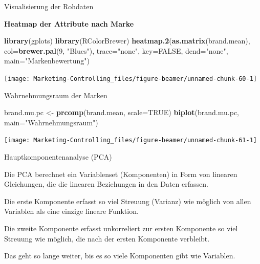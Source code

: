 \documentclass[12pt,ngerman,a4paper,ignorenonframetext,]{beamer}
\newenvironment{Shaded}{\begin{snugshade}}{\end{snugshade}}
\newcommand{\DataTypeTok}[1]{\textcolor[rgb]{0.13,0.29,0.53}{#1}}
\newcommand{\DecValTok}[1]{\textcolor[rgb]{0.00,0.00,0.81}{#1}}
\newcommand{\KeywordTok}[1]{\textcolor[rgb]{0.13,0.29,0.53}{\textbf{#1}}}
\newcommand{\NormalTok}[1]{#1}
\newcommand{\OtherTok}[1]{\textcolor[rgb]{0.56,0.35,0.01}{#1}}
\newcommand{\StringTok}[1]{\textcolor[rgb]{0.31,0.60,0.02}{#1}}
\begin{document}
\begin{frame}{Visualisierung der Rohdaten}
\protect\hypertarget{visualisierung-der-rohdaten}{}

\textbf{Heatmap der Attribute nach Marke}

\begin{Shaded}
\begin{Highlighting}[]
\KeywordTok{library}\NormalTok{(gplots)}
\KeywordTok{library}\NormalTok{(RColorBrewer)}
\KeywordTok{heatmap.2}\NormalTok{(}\KeywordTok{as.matrix}\NormalTok{(brand.mean),}
         \DataTypeTok{col=}\KeywordTok{brewer.pal}\NormalTok{(}\DecValTok{9}\NormalTok{, }\StringTok{"Blues"}\NormalTok{), }\DataTypeTok{trace=}\StringTok{"none"}\NormalTok{, }\DataTypeTok{key=}\OtherTok{FALSE}\NormalTok{, }\DataTypeTok{dend=}\StringTok{"none"}\NormalTok{,}
         \DataTypeTok{main=}\StringTok{"Markenbewertung"}\NormalTok{)}
\end{Highlighting}
\end{Shaded}

\begin{center}\texttt{[image: Marketing-Controlling\_files/figure-beamer/unnamed-chunk-60-1]} \end{center}

\end{frame}

\begin{frame}{Wahrnehmungsraum der Marken}
\protect\hypertarget{wahrnehmungsraum-der-marken}{}

\begin{Shaded}
\begin{Highlighting}[]
\NormalTok{brand.mu.pc <-}\StringTok{ }\KeywordTok{prcomp}\NormalTok{(brand.mean, }\DataTypeTok{scale=}\OtherTok{TRUE}\NormalTok{)}
\KeywordTok{biplot}\NormalTok{(brand.mu.pc, }\DataTypeTok{main=}\StringTok{"Wahrnehmungsraum"}\NormalTok{)}
\end{Highlighting}
\end{Shaded}

\begin{center}\texttt{[image: Marketing-Controlling\_files/figure-beamer/unnamed-chunk-61-1]} \end{center}

\end{frame}

\begin{frame}{Hauptkomponentenanalyse (PCA)}
\protect\hypertarget{hauptkomponentenanalyse-pca}{}

Die PCA berechnet ein Variablenset (Komponenten) in Form von linearen
Gleichungen, die die linearen Beziehungen in den Daten erfassen.

Die erste Komponente erfasst so viel Streuung (Varianz) wie möglich von
allen Variablen als eine einzige lineare Funktion.

Die zweite Komponente erfasst unkorreliert zur ersten Komponente so viel
Streuung wie möglich, die nach der ersten Komponente verbleibt.

Das geht so lange weiter, bis es so viele Komponenten gibt wie
Variablen.

\end{frame}
\end{document}
